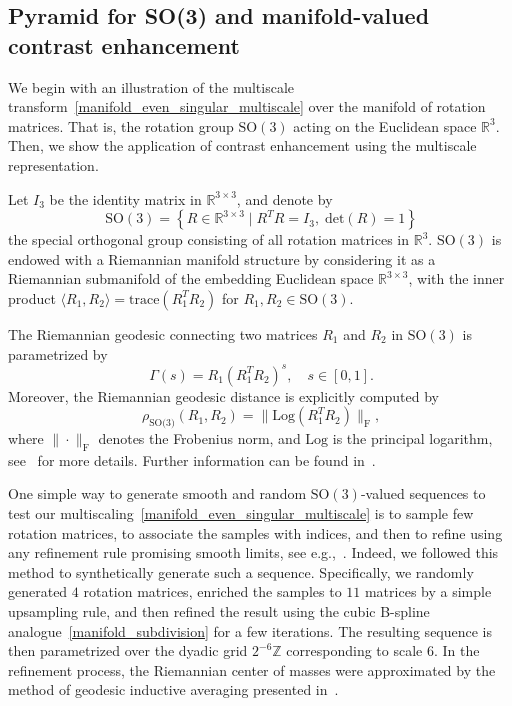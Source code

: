 \documentclass[12pt]{article}
\begin{document}
\subsection{Pyramid for SO(3) and manifold-valued contrast enhancement}

We begin with an illustration of the multiscale transform~\eqref{manifold_even_singular_multiscale} over the manifold of rotation matrices. That is, the rotation group $\text{SO}(3)$ acting on the Euclidean space $\mathbb{R}^3$. Then, we show the application of contrast enhancement using the multiscale representation.

Let $I_3$ be the identity matrix in $\mathbb{R}^{3\times 3}$, and denote by
\begin{equation}~\label{SO3_group}
    \text{SO}(3) = \left\{ R\in\mathbb{R}^{3\times 3} \;\big|\; R^TR= I_3, \; \text{det}(R) = 1\right\}
\end{equation}
the special orthogonal group consisting of all rotation matrices in $\mathbb{R}^{3}$. $\text{SO}(3)$ is endowed with a Riemannian manifold structure by considering it as a Riemannian submanifold of the embedding Euclidean space $\mathbb{R}^{3\times 3}$, with the inner product $\langle R_1, R_2\rangle = \text{trace}(R_1^TR_2)$ for $R_1,R_2\in\text{SO}(3)$.

The Riemannian geodesic connecting two matrices $R_1$ and $R_2$ in $\text{SO}(3)$ is parametrized by
\begin{equation}~\label{eqn:SO3_geodesic}
    \Gamma(s) = R_1(R_1^TR_2)^s, \quad s\in[0,1].
\end{equation}
Moreover, the Riemannian geodesic distance is explicitly computed by
\begin{equation}~\label{eqn:SO3_distance}
    \rho_{\text{SO(3)}}(R_1, R_2)=\|\text{Log}(R_1^TR_2)\|_{\text{F}},
\end{equation}
where $\|\cdot\|_\text{F}$ denotes the Frobenius norm, and $\text{Log}$ is the principal logarithm, see~\cite{moakher2002means} for more details. Further information can be found in~\cite{berger2012differential, curtis1979lie}.

One simple way to generate smooth and random $\text{SO}(3)$-valued sequences to test our multiscaling~\eqref{manifold_even_singular_multiscale} is to sample few rotation matrices, to associate the samples with indices, and then to refine using any refinement rule promising smooth limits, see e.g.,~\cite{wallner2011convergence}. Indeed, we followed this method to synthetically generate such a sequence. Specifically, we randomly generated $4$ rotation matrices, enriched the samples to $11$ matrices by a simple upsampling rule, and then refined the result using the cubic B-spline analogue~\eqref{manifold_subdivision} for a few iterations. The resulting sequence is then parametrized over the dyadic grid $2^{-6}\mathbb{Z}$ corresponding to scale 6. In the refinement process, the Riemannian center of masses were approximated by the method of geodesic inductive averaging presented in~\cite{dyn2017manifold}.
\end{document}
